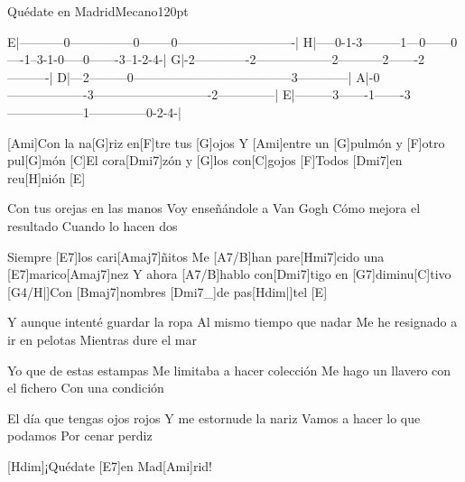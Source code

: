 \begin{song}{Quédate en Madrid}{Mecano}{120pt}

\tabs{20pt}
E|-----------0---------------0--------0----------------------------|
H|-----0-1-3---------1---0------0----1--3-1-0-----0-------3--1-2-4-|
G|-2-------------2------------------2-----------2-------2----------|
D|---2---------0--------------------------------------3------------|
A|-0-------------------3----------------------------2--------------|
E|---------3-------1-------3------------------1--------------0-2-4-|
\endtabs

%
[Ami]Con la na[G]riz en[F]tre tus [G]ojos
Y [Ami]entre un [G]pulmón y [F]otro pul[G]món
[C]El cora[Dmi7]zón y [G]los con[C]gojos
[F]Todos [Dmi7]en reu[H]nión [E]{}

%
Con tus orejas en las manos
Voy enseñándole a Van Gogh
Cómo mejora el resultado
Cuando lo hacen dos

\chorus%
[Hmi7]Siempre [E7]los cari[Amaj7]{}ñitos
Me [A7/B]han pare[Hmi7]cido una [E7]marico[Amaj7]nez
Y ahora [A7/B]hablo con[Dmi7]tigo en [G7]diminu[C]tivo
[G4/H|]{}Con [Bmaj7]nombres [Dmi7_]{de pas}[Hdim|]{tel} [E]{}

%
Y aunque intenté guardar la ropa
Al mismo tiempo que nadar
Me he resignado a ir en pelotas
Mientras dure el mar

\pagebreak
\chorus%
Yo que de estas estampas
Me limitaba a hacer colección
Me hago un llavero con el fichero
Con una condición

%
El día que tengas ojos rojos
Y me estornude la nariz
Vamos a hacer lo que podamos
Por cenar perdiz

[Hdim]{}¡Quédate [E7]en Mad[Ami]rid!
\end{song}
